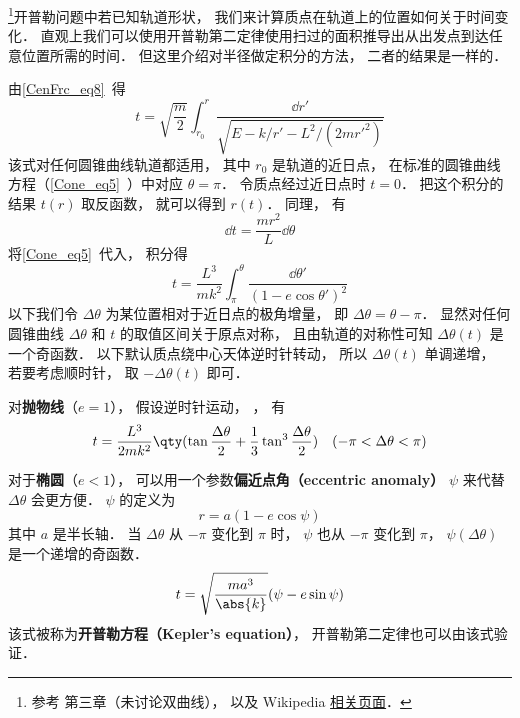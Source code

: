 

\footnote{参考 \cite{Goldstein} 第三章（未讨论双曲线）， 以及 Wikipedia \href{https://en.wikipedia.org/wiki/Kepler's_equation}{相关页面}． }开普勒问题中若已知轨道形状， 我们来计算质点在轨道上的位置如何关于时间变化． 直观上我们可以使用开普勒第二定律使用扫过的面积推导出从出发点到达任意位置所需的时间． 但这里介绍对半径做定积分的方法， 二者的结果是一样的．

由\autoref{CenFrc_eq8}~得
\begin{equation}
t = \sqrt{\frac{m}{2}} \int_{r_0}^r \frac{\dd{r'}}{\sqrt{E - k/r' - L^2/(2mr'^2)}}
\end{equation}
该式对任何圆锥曲线轨道都适用， 其中 $r_0$ 是轨道的近日点， 在标准的圆锥曲线方程（\autoref{Cone_eq5}~）中对应 $\theta = \pi$． 令质点经过近日点时 $t= 0$． 把这个积分的结果 $t(r)$ 取反函数， 就可以得到 $r(t)$． 同理， 有
\begin{equation}
\dd{t} = \frac{mr^2}{L}\dd{\theta}
\end{equation}
将\autoref{Cone_eq5}~代入， 积分得
\begin{equation}
t = \frac{L^3}{mk^2} \int_{\pi}^\theta \frac{\dd{\theta'}}{(1 - e\cos \theta')^2 }
\end{equation}
以下我们令 $\Delta\theta$ 为某位置相对于近日点的极角增量， 即 $\Delta \theta = \theta - \pi$． 显然对任何圆锥曲线 $\Delta \theta$ 和 $t$ 的取值区间关于原点对称， 且由轨道的对称性可知 $\Delta\theta(t)$ 是一个奇函数． 以下默认质点绕中心天体逆时针转动， 所以 $\Delta\theta(t)$ 单调递增， 若要考虑顺时针， 取 $-\Delta\theta(t)$ 即可．

对\textbf{抛物线}（$e = 1$）， 假设逆时针运动， ， 有
\begin{equation}\label{EqMoKp_eq3}
t = \frac{L^3}{2mk^2} \qty(\tan\frac{\Delta\theta}{2} +  \frac{1}{3}\tan^3 \frac{\Delta\theta}{2})\quad (-\pi<\Delta\theta<\pi)
\end{equation}

对于\textbf{椭圆}（$e < 1$）， 可以用一个参数\textbf{偏近点角（eccentric anomaly）} $\psi$ 来代替 $\Delta\theta$ 会更方便． $\psi$ 的定义为
\begin{equation}\label{EqMoKp_eq1}
r = a(1-e\cos\psi)
\end{equation}
其中 $a$ 是半长轴． 当 $\Delta\theta $ 从 $-\pi$ 变化到 $\pi$ 时， $\psi$ 也从 $-\pi$ 变化到 $\pi$， $\psi(\Delta\theta)$ 是一个递增的奇函数．
\begin{equation}\label{EqMoKp_eq5}
t = \sqrt{\frac{ma^3}{\abs{k}}} (\psi - e \sin\psi)
\end{equation}
该式被称为\textbf{开普勒方程（Kepler's equation）}， 开普勒第二定律也可以由该式验证．

